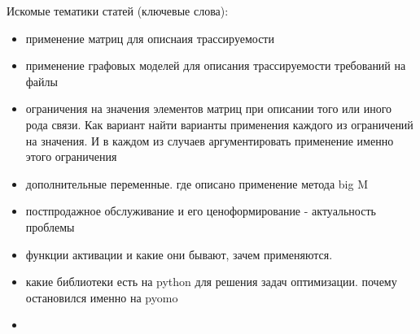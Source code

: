 






Искомые тематики статей (ключевые слова):
\begin{itemize}
  \item применение матриц для описнаия трассируемости
  \item применение графовых моделей для описания трассируемости требований на файлы
  \item ограничения на значения элементов матриц при описании того или иного рода связи. Как вариант найти варианты применения каждого из ограничений на значения. И в каждом из случаев аргументировать применение именно этого ограничения
  \item дополнительные переменные. где описано применение метода big M
  \item постпродажное обслуживание и его ценоформирование - актуальность проблемы
  \item функции активации и какие они бывают, зачем применяются.
  \item какие библиотеки есть на python для решения задач оптимизации. почему остановился именно на pyomo
  \item 
\end{itemize}

